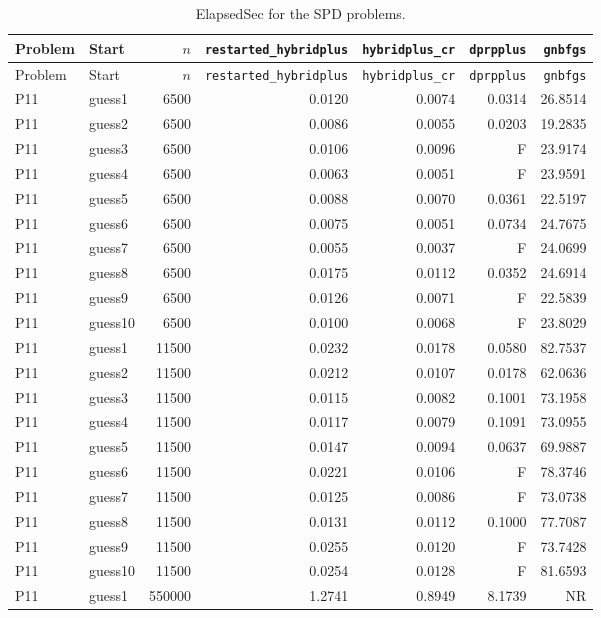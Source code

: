 {\footnotesize
\begin{longtable}{llrrrrr}
\caption{ElapsedSec for the SPD problems.}\label{tab:spd_elapsed_seconds}\\
\toprule Problem & Start & $n$ & \texttt{restarted\_hybridplus} & \texttt{hybridplus\_cr} & \texttt{dprpplus} & \texttt{gnbfgs} \\
\midrule
\endfirsthead
\toprule Problem & Start & $n$ & \texttt{restarted\_hybridplus} & \texttt{hybridplus\_cr} & \texttt{dprpplus} & \texttt{gnbfgs} \\
\midrule
\endhead
\bottomrule
\endfoot
P11 & guess1 & 6500 & 0.0120 & 0.0074 & 0.0314 & 26.8514 \\
P11 & guess2 & 6500 & 0.0086 & 0.0055 & 0.0203 & 19.2835 \\
P11 & guess3 & 6500 & 0.0106 & 0.0096 & F & 23.9174 \\
P11 & guess4 & 6500 & 0.0063 & 0.0051 & F & 23.9591 \\
P11 & guess5 & 6500 & 0.0088 & 0.0070 & 0.0361 & 22.5197 \\
P11 & guess6 & 6500 & 0.0075 & 0.0051 & 0.0734 & 24.7675 \\
P11 & guess7 & 6500 & 0.0055 & 0.0037 & F & 24.0699 \\
P11 & guess8 & 6500 & 0.0175 & 0.0112 & 0.0352 & 24.6914 \\
P11 & guess9 & 6500 & 0.0126 & 0.0071 & F & 22.5839 \\
P11 & guess10 & 6500 & 0.0100 & 0.0068 & F & 23.8029 \\
P11 & guess1 & 11500 & 0.0232 & 0.0178 & 0.0580 & 82.7537 \\
P11 & guess2 & 11500 & 0.0212 & 0.0107 & 0.0178 & 62.0636 \\
P11 & guess3 & 11500 & 0.0115 & 0.0082 & 0.1001 & 73.1958 \\
P11 & guess4 & 11500 & 0.0117 & 0.0079 & 0.1091 & 73.0955 \\
P11 & guess5 & 11500 & 0.0147 & 0.0094 & 0.0637 & 69.9887 \\
P11 & guess6 & 11500 & 0.0221 & 0.0106 & F & 78.3746 \\
P11 & guess7 & 11500 & 0.0125 & 0.0086 & F & 73.0738 \\
P11 & guess8 & 11500 & 0.0131 & 0.0112 & 0.1000 & 77.7087 \\
P11 & guess9 & 11500 & 0.0255 & 0.0120 & F & 73.7428 \\
P11 & guess10 & 11500 & 0.0254 & 0.0128 & F & 81.6593 \\
P11 & guess1 & 550000 & 1.2741 & 0.8949 & 8.1739 & NR \\

\end{longtable}}

